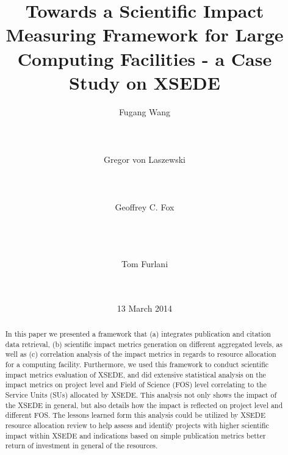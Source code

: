 \documentclass{sig-alternate}
\newcommand{\TITLE}{Towards a Scientific Impact Measuring Framework for Large Computing Facilities - a Case Study on XSEDE}
\begin{document}
 
% 
 
\title{\TITLE} 
 
\author{ 
\alignauthor 
Fugang Wang\\ 
       \\ 
       \\ 
       \\ 
\alignauthor 
Gregor von Laszewski\\ 
       \\ 
       \\ 
       \\ 
\alignauthor 
Geoffrey C. Fox\\ 
       \\ 
       \\ 
       \\ 
\and  %
\alignauthor  
Tom Furlani\\ 
       \\ 
       \\ 
} 
\date{13 March 2014} 
 
\toappear{} 
\maketitle 
\begin{abstract} 
 
In this paper we presented a framework that (a) integrates publication and citation data retrieval, (b) scientific impact metrics generation on different aggregated levels, as well as (c) correlation analysis of the impact metrics in regards to resource allocation for a computing facility. Furthermore, we used this  framework to conduct scientific impact metrics evaluation of XSEDE, and did extensive statistical analysis on the impact metrics on project level and Field of Science (FOS) level correlating to the Service Units (SUs) allocated by XSEDE. This analysis not only shows the impact of the XSEDE in general, but also details how the impact is reflected on project level and different FOS. The lessons learned form this analysis could be utilized by XSEDE resource allocation review to help assess and identify projects with higher scientific impact within XSEDE and indications based on simple publication metrics better return of investment in general of the resources.
 
\end{abstract} 
 
\end{document}
